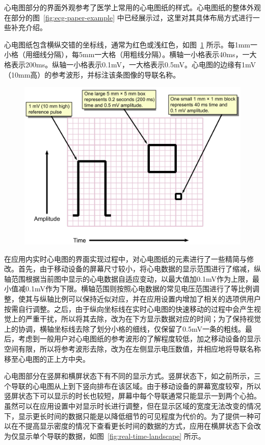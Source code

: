 心电图部分的界面外观参考了医学上常用的心电图纸的样式。心电图纸的整体外观在部分的图~\ref{fig:ecg-paper-example} 中已经展示过，这里对其具体布局方式进行一些补充介绍。

心电图纸包含横纵交错的坐标线，通常为红色或浅红色，如图~\ref{fig:ecg-paper} 所示。每1mm一小格（用细线分隔），每5mm一大格（用粗线分隔）。横轴一小格表示40ms，一大格表示200ms。纵轴一小格表示0.1mV，一大格表示0.5mV。心电图的边缘有1mV（10mm高）的参考波形，并标注该条图像的导联名称。

\begin{figure}[ht]
    \includegraphics[width=\textwidth]{../assets/ECG_Paper_v2}
    \label{fig:ecg-paper}
\end{figure}

在应用内实时心电图的界面实现过程中，对心电图纸的元素进行了一些精简与修改。首先，由于移动设备的屏幕尺寸较小，将心电数据的显示范围进行了缩减，纵轴范围根据当前图中显示的心电数据自适应变动，以最大值加0.1mV作为上限，最小值减0.1mV作为下限。横轴范围则按照心电数据的常见电压范围进行了等比例调整，使其与纵轴比例可以保持近似对应，并在应用设置内增加了相关的选项供用户按需自行调整。之后，由于纵向坐标线在实时心电图的快速移动的过程中会产生视觉上的严重干扰，所以将其去除，改为在下方显示数据对应的时间；为了保持视觉上的协调，横轴坐标线去除了划分小格的细线，仅保留了0.5mV一条的粗线。最后，考虑到一般用户对心电图纸的参考波形的了解程度较低，加之移动设备的显示空间有限，所以将参考波形去除，改为在左侧显示电压数值，并相应地将导联名称移至心电图的正上方中央。

心电图部分在竖屏和横屏状态下有不同的显示方式。竖屏状态下，如之前所示，三个导联的心电图从上到下竖向排布在该区域。由于移动设备的屏幕宽度较窄，所以竖屏状态下可以显示的时长也较短，屏幕中每个导联通常只能显示一到两个心拍。虽然可以在应用设置中对显示时长进行调整，但在显示区域的宽度无法改变的情况下，显示更长时间的数据只能是以降低细节的可见程度为代价的。为了提供一种可以在不提高显示密度的情况下查看更长时间的数据的方式，应用在横屏状态下会改为仅显示单个导联的数据，如图~\ref{fig:real-time-landscape} 所示。

